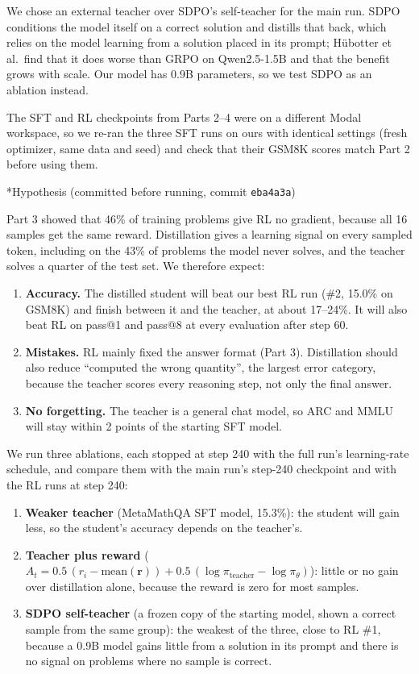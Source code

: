 \documentclass[11pt]{article}
\makeatletter
\renewcommand\subsection{\@startsection{subsection}{2}{\z@}{0.6em}{0.2em}{\normalsize\bfseries}}
\newcommand{\code}[1]{\texttt{#1}}
\makeatother
\begin{document}
We chose an external teacher over SDPO's self-teacher \cite{sdpo} for the main run. SDPO conditions the model itself on a correct solution and distills that back, which relies on the model learning from a solution placed in its prompt; Hübotter et al.\ find that it does worse than GRPO on Qwen2.5-1.5B and that the benefit grows with scale. Our model has 0.9B parameters, so we test SDPO as an ablation instead.

The SFT and RL checkpoints from Parts 2--4 were on a different Modal workspace, so we re-ran the three SFT runs on ours with identical settings (fresh optimizer, same data and seed) and check that their GSM8K scores match Part 2 before using them.

\subsection*{Hypothesis (committed before running, commit \code{eba4a3a})}

Part 3 showed that 46\% of training problems give RL no gradient, because all 16 samples get the same reward. Distillation gives a learning signal on every sampled token, including on the 43\% of problems the model never solves, and the teacher solves a quarter of the test set. We therefore expect:
\begin{enumerate}[nosep]
  \item \textbf{Accuracy.} The distilled student will beat our best RL run (\#2, 15.0\% on GSM8K) and finish between it and the teacher, at about 17--24\%. It will also beat RL on pass@1 and pass@8 at every evaluation after step 60.
  \item \textbf{Mistakes.} RL mainly fixed the answer format (Part 3). Distillation should also reduce ``computed the wrong quantity'', the largest error category, because the teacher scores every reasoning step, not only the final answer.
  \item \textbf{No forgetting.} The teacher is a general chat model, so ARC and MMLU will stay within 2 points of the starting SFT model.
\end{enumerate}
We run three ablations, each stopped at step 240 with the full run's learning-rate schedule, and compare them with the main run's step-240 checkpoint and with the RL runs at step 240:
\begin{enumerate}
  \item \textbf{Weaker teacher} (MetaMathQA SFT model, 15.3\%): the student will gain less, so the student's accuracy depends on the teacher's.
  \item \textbf{Teacher plus reward} ($A_t = 0.5\,(r_i-\text{mean}(\mathbf{r})) + 0.5\,(\log\pi_{\text{teacher}}-\log\pi_\theta)$): little or no gain over distillation alone, because the reward is zero for most samples.
  \item \textbf{SDPO self-teacher} (a frozen copy of the starting model, shown a correct sample from the same group): the weakest of the three, close to RL \#1, because a 0.9B model gains little from a solution in its prompt and there is no signal on problems where no sample is correct.
\end{enumerate}
\end{document}
